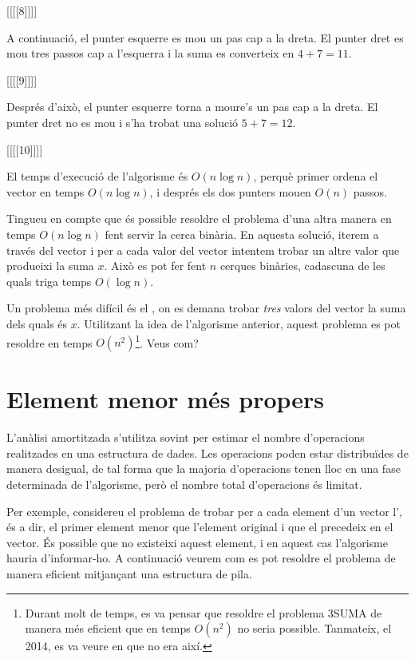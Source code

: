[[[[8]]]]


A continuació, el punter esquerre es mou un pas cap a la dreta. El
punter dret es mou tres passos cap a l'esquerra i la suma es
converteix en $4+7=11$.


[[[[9]]]]


Després d'això, el punter esquerre torna a moure's un pas cap a la
dreta. El punter dret no es mou i s'ha trobat una solució $5+7=12$.


[[[[10]]]]


El temps d'execució de l'algorisme és $O(n \log n)$, perquè primer
ordena el vector en temps $O(n \log n)$, i després els dos punters
mouen $O(n)$ passos.

Tingueu en compte que és possible resoldre el problema d'una altra
manera en temps $O(n \log n)$ fent servir la cerca binària. En aquesta
solució, iterem a través del vector i per a cada valor del vector
intentem trobar un altre valor que produeixi la suma $x$. Això es pot
fer fent $n$ cerques binàries, cadascuna de les quals triga temps
$O(\log n)$.

 Un problema més difícil és el ,
on es demana trobar \emph{tres} valors del vector la suma dels quals és $x$.
Utilitzant la idea de l'algorisme anterior, aquest problema es pot resoldre
en temps $O(n^2)$\footnote{Durant molt de temps, es va pensar que resoldre el
problema 3SUMA de manera més eficient que en temps $O(n^2) $ no seria
possible. Tanmateix, el 2014, es va veure en \cite{gro14} que no era així.}.
Veus com?

\section{Element menor més propers}


L'anàlisi amortitzada s'utilitza sovint per estimar el nombre
d'operacions realitzades en una estructura de dades. Les operacions
poden estar distribuïdes de manera desigual, de tal forma que la
majoria d'operacions tenen lloc en una fase determinada de
l'algorisme, però el nombre total d'operacions és limitat.

Per exemple, considereu el problema de trobar per a cada element d'un
vector l', és a dir, el primer element
menor que l'element original i que el precedeix en el vector. És
possible que no existeixi aquest element, i en aquest cas l'algorisme
hauria d'informar-ho. A continuació veurem com es pot resoldre el
problema de manera eficient mitjançant una estructura de pila.

